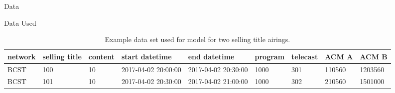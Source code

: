 \begin{chapter}{Data}
\begin{section}{Data Used}
  \begin{table}[h!]
    \begin{adjustbox}{width=1.1\textwidth,center=\textwidth}
      \large
      \begin{tabular}{lllllllll}
        network & selling title & content & start datetime & end datetime & program & telecast & ACM A & ACM B\\
        \hline
        BCST & 100 & 10 & 2017-04-02 20:00:00 & 2017-04-02 20:30:00 & 1000 & 301 & 110560 & 1203560\\
        BCST & 101 & 10 & 2017-04-02 20:30:00 & 2017-04-02 21:00:00 & 1000 & 302 & 210560 & 1501000\\
      \end{tabular}
    \end{adjustbox}
    \caption{Example data set used for model for two selling title airings.}\label{tab:data}
  \end{table}


\end{section}

\end{chapter}